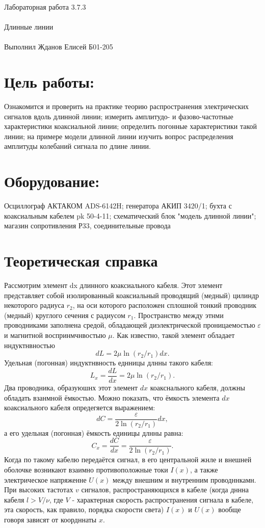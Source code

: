 \documentclass{astroedu-lab}
\begin{document}
\pagestyle{plain}

\begin{problem}{\huge Лабораторная работа 3.7.3\\\\Длинные линии\\\\Выполнил Жданов Елисей Б01-205}

\section{Цель работы:}

Ознакомится и проверить на практике теорию распространения
электрических сигналов вдоль длинной линии; измерить амплитудо- и фазово-частотные
характеристики коаксиальной линии; определить погонные характеристики такой
линии; на примере модели длинной линии изучить вопрос распределения амплитуды
колебаний сигнала по длине линии.

\section{Оборудование:}

Осциллограф АКТАКОМ ADS-6142H; генератора АКИП 3420/1; бухта с
коаксиальным кабелем pk 50-4-11; схематический блок "модель длинной линии"; магазин
сопротивления Р33, соединительные провода

\section{Теоретическая справка}

Рассмотрим элемент dx длинного коаксиального кабеля. Этот элемент представляет собой изолированный коаксиальный проводящий (медный) цилиндр некоторого радиуса $r_2$, на оси которого расположен сплошной тонкий проводник (медный) круглого сечения с радиусом $r_1$. Пространство между этнми проводниками заполнена средой, обладающей диэлектрнческой проницаемостью $\varepsilon$ и магнитной воспринмчнвостыю $\mu$. Как нзвестно, такой элемент обладает нндуктнвностью
$$
d L=2 \mu \ln \left(r_2 / r_1\right) d x .
$$
Удельная (погонная) индуктнвность еднницы длнны такого кабеля:
$$
L_x=\frac{d L}{d x}=2 \mu \ln \left(r_2 / r_1\right) .
$$
Два проводника, образуюшнх этот элемент $d x$ коакснального кабеля, должны обладать взанмной ёмкостью. Можно показать, что ёмкость элемента $d x$ коаксиального кабеля опредегяется выражением:
$$
d C=\frac{\varepsilon}{2 \ln \left(r_2 / r_1\right)} d x,
$$
а его удельная (погонная) ёмкость единицы длнны равна:
$$
C_x=\frac{d C}{d x}=\frac{\varepsilon}{2 \ln \left(r_2 / r_1\right)} .
$$
Когда по такому кабелю передаётся сигнал, в его центральной жнле и внешней оболочке возникают взаимно противоположные токи $I(x)$, а также электрическое напряженне $U(x)$ между внешним и внутренним проводннкамн. При высоких тастотах $v$ сигналов, распространяющихся в кабеле (когда дннна кабеля $l>V / \nu$, где $V$ - характерная скорость распространения сигнала в кабеле, эта скорость, как правило, порядка скорости света) $I(x)$ и $U(x)$ вообще говоря зависят от коордннаты $x$.


\end{problem}
\end{document}
